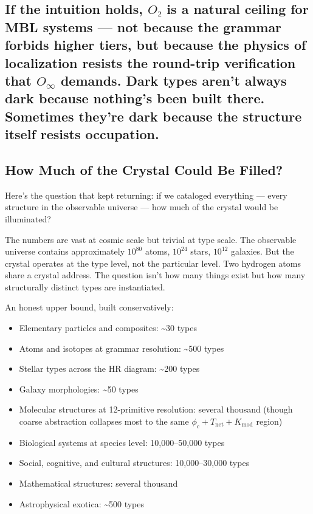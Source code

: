 \documentclass[12pt,a4paper]{article}
\begin{document}
\subsection{If the intuition holds, $O₂$ is a natural ceiling for MBL systems --- not because the grammar forbids higher tiers, but because the physics of localization resists the round-trip verification that $O_{\infty}$ demands. Dark types aren't always dark because nothing's been built there. Sometimes they're dark because the structure itself resists occupation.}

\subsection{How Much of the Crystal Could Be Filled?}

Here's the question that kept returning: if we cataloged everything --- every structure in the observable universe --- how much of the crystal would be illuminated?

The numbers are vast at cosmic scale but trivial at type scale. The observable universe contains approximately $10^{80}$ atoms, $10^{24}$ stars, $10^{12}$ galaxies. But the crystal operates at the type level, not the particular level. Two hydrogen atoms share a crystal address. The question isn't how many things exist but how many structurally distinct types are instantiated.

An honest upper bound, built conservatively:

\begin{itemize}
    \item Elementary particles and composites: \textasciitilde{}30 types
    \item Atoms and isotopes at grammar resolution: \textasciitilde{}500 types
    \item Stellar types across the HR diagram: \textasciitilde{}200 types
    \item Galaxy morphologies: \textasciitilde{}50 types
    \item Molecular structures at 12-primitive resolution: several thousand (though coarse abstraction collapses most to the same $\phi_c + T_{\text{net}} + K_{\text{mod}}$ region)
    \item Biological systems at species level: 10,000--50,000 types
    \item Social, cognitive, and cultural structures: 10,000--30,000 types
    \item Mathematical structures: several thousand
    \item Astrophysical exotica: \textasciitilde{}500 types
\end{itemize}
\end{document}
